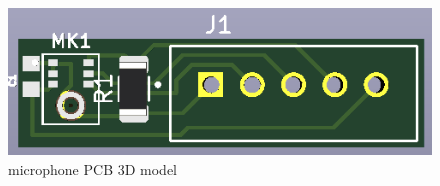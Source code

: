     \begin{figure}[hb]\centering
         \includegraphics[width=1\textwidth,height=1\textheight,keepaspectratio]{figs/PCB_3Dmodel.PNG}
    	\caption{microphone PCB 3D model}\label{fig:radiation}
    \end{figure}
    
